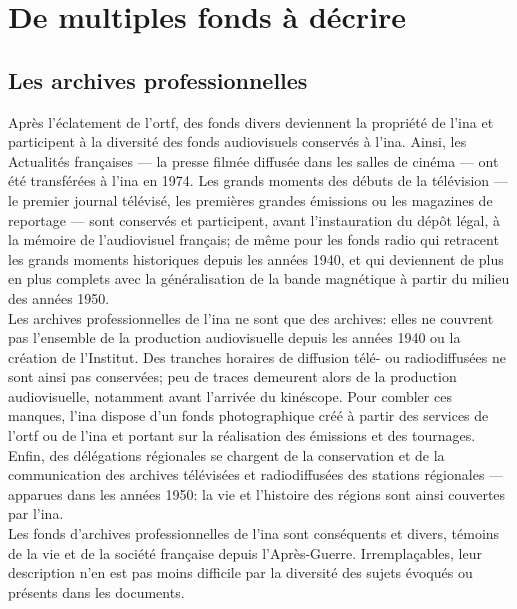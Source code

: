 \section{\label{I-B-1}De multiples fonds à décrire}


\subsection{\label{I-B-1-a}Les archives professionnelles}

Après l'éclatement de l'\ac{ortf}, des fonds divers deviennent la propriété de l'\ac{ina} et participent à la diversité des fonds audiovisuels conservés à l'\ac{ina}. Ainsi, les \og Actualités françaises\fg{} --- la presse filmée diffusée dans les salles de cinéma --- ont été transférées à l'\ac{ina} en 1974. Les grands moments des débuts de la télévision --- le premier journal télévisé, les premières grandes émissions ou les magazines de reportage --- sont conservés et participent, avant l'instauration du dépôt légal, à la mémoire de l'audiovisuel français; de même pour les fonds radio qui retracent les grands moments historiques depuis les années 1940, et qui deviennent de plus en plus complets avec la généralisation de la bande magnétique à partir du milieu des années 1950.\\

Les archives professionnelles de l'\ac{ina} ne sont que des archives: elles ne couvrent pas l'ensemble de la production audiovisuelle depuis les années 1940 ou la création de l'Institut. Des tranches horaires de diffusion télé- ou radiodiffusées ne sont ainsi pas conservées; peu de traces demeurent alors de la production audiovisuelle, notamment avant l'arrivée du kinéscope. Pour combler ces manques, l'\ac{ina} dispose d'un fonds photographique créé à partir des services de l'\ac{ortf} ou de l'\ac{ina} et portant sur la réalisation des émissions et des tournages.\\

Enfin, des délégations régionales se chargent de la conservation et de la communication des archives télévisées et radiodiffusées des stations régionales --- apparues dans les années 1950: la vie et l'histoire des régions sont ainsi couvertes par l'\ac{ina}.\\

Les fonds d'archives professionnelles de l'\ac{ina} sont conséquents et divers, témoins de la vie et de la société française depuis l'Après-Guerre. Irremplaçables, leur description n'en est pas moins difficile par la diversité des sujets évoqués ou présents dans les documents.

